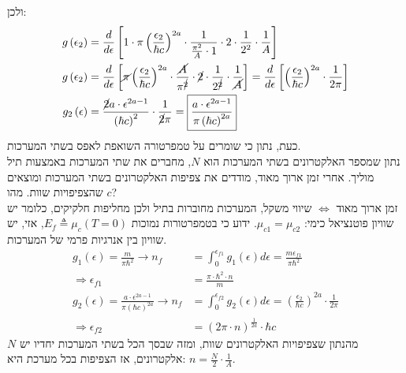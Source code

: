 \documentclass{article}
\begin{document}
\begin{Question}
ולכן:
\begin{align*}
    g\left( \epsilon_{2} \right)&=\frac{d}{d\epsilon}\left[ 1
    \cdot  \pi\left( \frac{\epsilon_{2}}{\hbar c} \right)^{2a}
    \cdot \frac{1}
    {\frac{\pi^{2}}{A}\cdot1}
    \cdot2
    \cdot\frac{1}{2^{2}}
    \cdot\frac{1}{A}
    \right]\\
    g\left( \epsilon_{2} \right)&=\frac{d}{d\epsilon}\left[
    \cancel{\pi}\left( \frac{\epsilon_{2}}{\hbar c} \right)^{2a}
    \cdot \frac{\cancel{A}}
    {\pi^{\cancel{2}}}
    \cdot\cancel{2}
    \cdot\frac{1}{2^{\cancel{2}}}
    \cdot\frac{1}{\cancel{A}}
    \right]
    =\frac{d}{d\epsilon}\left[ 
        \left( \frac{\epsilon_{2}}{\hbar c} \right)^{2a}\cdot\frac{1}{2\pi}
    \right]\\
    g_{2}\left( \epsilon \right)&=\frac{\cancel{2}a\cdot \epsilon^{2a-1}}{\left( \hbar c \right)^{2}}\cdot\frac{1}{\cancel{2}\pi}=\boxed{\frac{a\cdot \epsilon^{2a-1}}{\pi\left( \hbar c \right)^{2a}}}\\
\end{align*}
כעת, נתון כי שומרים על טמפרטורה השואפת לאפס בשתי המערכות.\\
נתון שמספר האלקטרונים בשתי המערכות הוא $N$, מחברים את שתי המערכות באמצעות תיל מוליך. אחרי זמן ארוך מאוד, מודדים את צפיפות האלקטרונים בשתי המערכות ומוצאים שהצפיפויות שוות. מהו $c$?\\
זמן ארוך מאוד $\Leftrightarrow$ שיווי משקל, המערכות מחוברות בתיל ולכן מחליפות חלקיקים, כלומר יש שוויון פוטנציאל כימי: $\mu_{c1}=\mu_{c2}$. ידוע כי בטמפרטורות נמוכות $E_{f}\triangleq \mu_{c}\left( T=0 \right)$, אזי, יש שוויון בין אנרגיות פרמי של המערכות.
\begin{align*}
    g_{1}\left( \epsilon \right)=\frac{m}{\pi\hbar^{2}}\rightarrow n_{f}&=\int_{0}^{\epsilon_{f1}}{g_{1}\left( \epsilon \right)d\epsilon}=\frac{m\epsilon_{f1}}{\pi\hbar^{2}}\\
    \Rightarrow \epsilon_{f1}&=\frac{\pi\cdot\hbar^{2}\cdot n}{m}\\
    g_{2}\left( \epsilon \right)=\frac{a\cdot \epsilon^{2a-1}}{\pi\left( \hbar c \right)^{2a}}
    \rightarrow n_{f}&=\int_{0}^{\epsilon_{f2}}{g_{2}\left( \epsilon \right)d\epsilon}=
    \left( \frac{\epsilon_{2}}{\hbar c} \right)^{2a}\cdot\frac{1}{2\pi}\\
    \Rightarrow \epsilon_{f2}&=\left( 2\pi\cdot n \right)^{\frac{1}{2a}}\cdot\hbar c
\end{align*}
מהנתון שצפיפויות האלקטרונים שוות, ומזה שבסך הכל בשתי המערכות יחדיו יש $N$ אלקטרונים, אז הצפיפות בכל מערכת היא: $n=\frac{N}{2}\cdot\frac{1}{A}$.

\end{Question}
\end{document}
